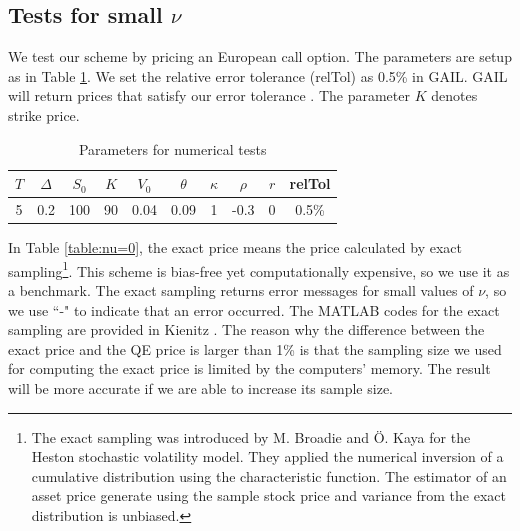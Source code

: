 \documentclass{ws-ijfe}
\begin{document}
\subsection{Tests for small $\nu$}

We test our scheme by pricing an European call option. The parameters are setup as in Table \ref{tab:params setup for n=0}. We set the relative error tolerance (relTol) as 0.5\% in GAIL. GAIL will return prices that satisfy our error tolerance \cite{Hickernell2012}. The parameter $K$ denotes strike price.
\begin{table}[h]
 \caption{Parameters for numerical tests} %
 \centering                          %
 \begin{tabular}{cccccccccc}          %
 \hline\hline                        %
 $T$ & $\Delta$ & $S_0$ & $K$ & $V_0$ & $\theta$ & $\kappa$ & $\rho$ & $r$ & relTol\\ [0.5ex]
 \hline                                      %
5  & 0.2 & 100 & 90 & 0.04 & 0.09 & 1 & -0.3& 0 & 0.5\%\\[1ex] %
 \hline                                       %
 \end{tabular}
 \label{tab:params setup for n=0}
 \end{table}
In Table \ref{table:nu=0}, the exact price means the price calculated by exact sampling\footnote{The exact sampling was introduced by M. Broadie and \"{O}. Kaya for the Heston stochastic volatility model. They applied the numerical inversion of a cumulative distribution using the characteristic function. The estimator of an asset price generate using the sample stock price and variance from the exact distribution is unbiased.}. This scheme is bias-free yet computationally expensive, so we use it as a benchmark. The exact sampling returns error messages for small values of $\nu$, so we use ``-" to indicate that an error occurred. The MATLAB codes for the exact sampling are provided in Kienitz \cite{Kienitz2012}. The reason why the difference between the exact price and the QE price is larger than 1\%  is that the sampling size we used for computing the exact price is limited by the computers' memory. The result will be more accurate if we are able to increase its sample size.
\end{document}
